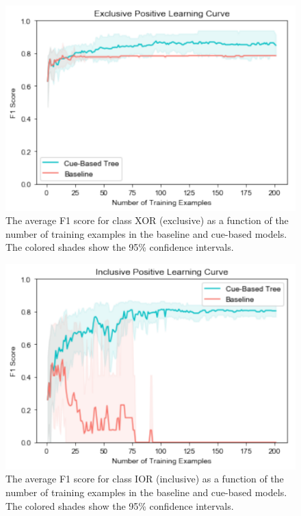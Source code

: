 \documentclass[,man,floatsintext]{apa6}
\begin{document}
\begin{figure}
\centering
\includegraphics{figs/XorBinary-1.pdf}
\caption{\label{fig:XorBinary}The average F1 score for class XOR (exclusive) as a function of the number of training examples in the baseline and cue-based models. The colored shades show the 95\% confidence intervals.}
\end{figure}

\begin{figure}
\centering
\includegraphics{figs/IorBinary-1.pdf}
\caption{\label{fig:IorBinary}The average F1 score for class IOR (inclusive) as a function of the number of training examples in the baseline and cue-based models. The colored shades show the 95\% confidence intervals.}
\end{figure}
\end{document}
